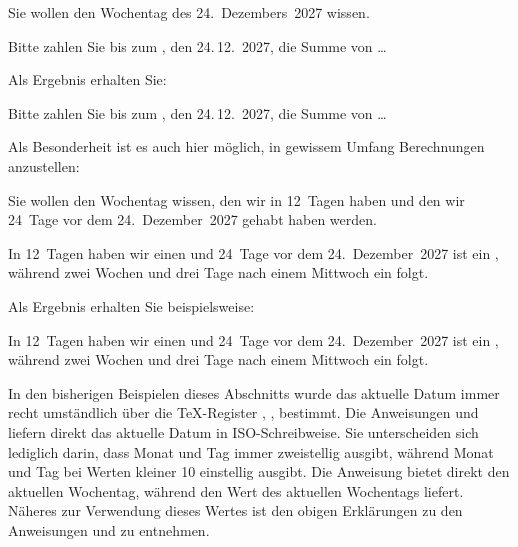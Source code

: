 \begin{Example}
   Sie wollen den Wochentag des 24.~Dezembers~2027 wissen.
\begin{lstcode}
  Bitte zahlen Sie bis zum , 
  den 24.\,12.~2027, die Summe von \dots
\end{lstcode}
  Als Ergebnis erhalten Sie:
  \begin{ShowOutput}
  Bitte zahlen Sie bis zum 
  , den 
  24.\,12.~2027, die Summe von \dots
  \end{ShowOutput}
\end{Example}
 
Als Besonderheit ist es auch hier möglich, in gewissem Umfang Berechnungen
anzustellen:
\begin{Example}
  Sie wollen den Wochentag wissen, den wir in 12~Tagen haben und
  den wir 24~Tage vor dem 24.~Dezember~2027 gehabt haben werden.
\begin{lstcode}
  In 12~Tagen haben wir einen 
   und
  24~Tage vor dem 24.~Dezember~2027 ist ein
  , während zwei Wochen 
  und drei Tage nach einem Mittwoch ein 
   folgt.
\end{lstcode}
  Als Ergebnis erhalten Sie beispielsweise:
  \begin{ShowOutput}
  In 12~Tagen haben wir einen 
   und
  24~Tage vor dem 24.~Dezember~2027 ist ein
  , während
  zwei Wochen und drei Tage nach
  einem Mittwoch ein 
  folgt.
  \end{ShowOutput}
\end{Example}%
%
\EndIndexGroup
\ExampleEndFix


\begin{Declaration}
\end{Declaration}%
In den bisherigen Beispielen dieses Abschnitts wurde das aktuelle Datum immer
recht umständlich über die \TeX-Register ,
,  bestimmt. Die
Anweisungen  und
 liefern direkt das aktuelle Datum in ISO-Schreibweise. Sie
unterscheiden sich lediglich darin, dass  Monat und Tag immer
zweistellig ausgibt, während  Monat und Tag bei Werten kleiner
10 einstellig ausgibt. Die Anweisung  bietet direkt den
aktuellen Wochentag, während  den Wert des aktuellen
Wochentags liefert. Näheres zur Verwendung dieses Wertes ist den obigen
Erklärungen zu den Anweisungen  und
 zu entnehmen.

